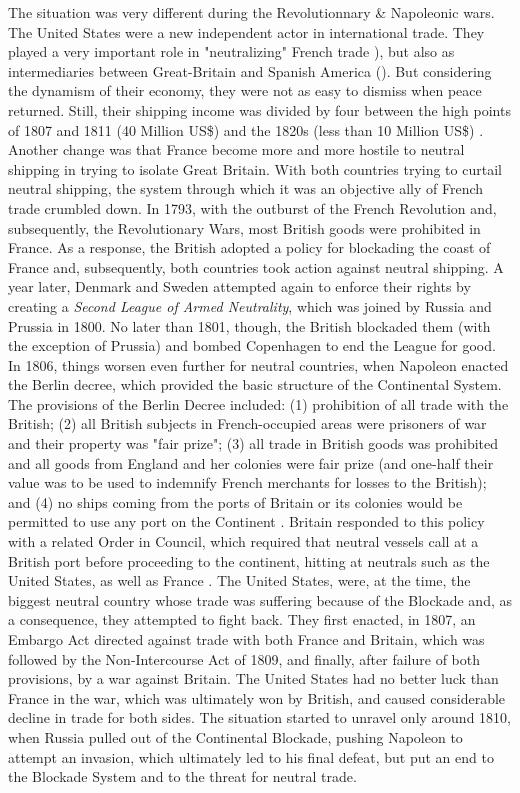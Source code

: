 \documentclass[12pt,a4paper,notitlepage,english]{article}
\begin{document}
  
The situation was very different during the Revolutionnary \& Napoleonic wars.
The United States were a new independent actor in international trade.
They played a very important role in "neutralizing" French trade \citep{Marzagalli2005,Marzagalli2015}), but also as intermediaries between Great-Britain and Spanish America (\cite{Cuenca-Esteban2014}).
But considering the dynamism of their economy, they were not as easy to dismiss when peace returned.
Still, their shipping income was divided by four between the high points of 1807 and 1811 (40 Million US\$) and the 1820s (less than 10 Million US\$) \citep[tables A-4 and B-2]{North1960}.
Another change was that France become more and more hostile to neutral shipping in trying to isolate Great Britain.
With both countries trying to curtail neutral shipping, the system through which it was an objective ally of French trade crumbled down.
In 1793, with the outburst of the French Revolution and, subsequently, the Revolutionary Wars, most British goods were prohibited in France.
As a response, the British adopted a policy for blockading the coast of France and, subsequently, both countries took action against neutral shipping.
A year later, Denmark and Sweden attempted again to enforce their rights by creating a \textit{Second League of Armed Neutrality}, which was joined by Russia and Prussia in 1800.
No later than 1801, though, the British blockaded them (with the exception of Prussia) and bombed Copenhagen to end the League for good.
In 1806, things worsen even further for neutral countries, when Napoleon enacted the Berlin decree, which provided the basic structure of the Continental System.
The provisions of the Berlin Decree included: (1) prohibition of all trade with the British; (2) all British subjects in French-occupied areas were prisoners of war and their property was "fair prize"; (3) all trade in British goods was prohibited and all goods from England and her colonies were fair prize (and one-half their value was to be used to indemnify French merchants for losses to the British); and (4) no ships coming from the ports of Britain or its colonies would be permitted to use any port on the Continent \citep{Davis2006}.
Britain responded to this policy with a related Order in Council, which required that neutral vessels call at a British port before proceeding to the continent, hitting at neutrals such as the United States, as well as France \citep{Davis2006}.
The United States, were, at the time, the biggest neutral country whose trade was suffering because of the Blockade and, as a consequence, they attempted to fight back.
They first enacted, in 1807, an Embargo Act directed against trade with both France and Britain, which was followed by the Non-Intercourse Act of 1809, and finally, after failure of both provisions, by a war against Britain.
The United States had no better luck than France in the war, which was ultimately won by British, and caused considerable decline in trade for both sides.
The situation started to unravel only around 1810, when Russia pulled out of the Continental Blockade, pushing Napoleon to attempt an invasion, which ultimately led to his final defeat, but put an end to the Blockade System and to the threat for neutral trade.
\end{document}

